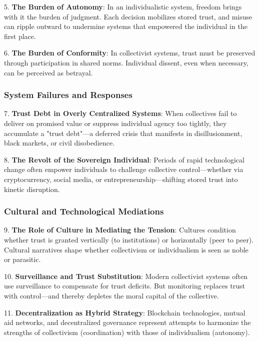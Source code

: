 \documentclass[11pt,oneside]{book}
\begin{document}
5. \textbf{The Burden of Autonomy}: In an individualistic system, freedom brings with it the burden of judgment. Each decision mobilizes stored trust, and misuse can ripple outward to undermine systems that empowered the individual in the first place.



6. \textbf{The Burden of Conformity}: In collectivist systems, trust must be preserved through participation in shared norms. Individual dissent, even when necessary, can be perceived as betrayal.


\subsubsection{System Failures and Responses}


7. \textbf{Trust Debt in Overly Centralized Systems}: When collectives fail to deliver on promised value or suppress individual agency too tightly, they accumulate a "trust debt"—a deferred crisis that manifests in disillusionment, black markets, or civil disobedience.



8. \textbf{The Revolt of the Sovereign Individual}: Periods of rapid technological change often empower individuals to challenge collective control—whether via cryptocurrency, social media, or entrepreneurship—shifting stored trust into kinetic disruption.


\subsubsection{Cultural and Technological Mediations}


9. \textbf{The Role of Culture in Mediating the Tension}: Cultures condition whether trust is granted vertically (to institutions) or horizontally (peer to peer). Cultural narratives shape whether collectivism or individualism is seen as noble or parasitic.



10. \textbf{Surveillance and Trust Substitution}: Modern collectivist systems often use surveillance to compensate for trust deficits. But monitoring replaces trust with control—and thereby depletes the moral capital of the collective.



11. \textbf{Decentralization as Hybrid Strategy}: Blockchain technologies, mutual aid networks, and decentralized governance represent attempts to harmonize the strengths of collectivism (coordination) with those of individualism (autonomy).
\end{document}
